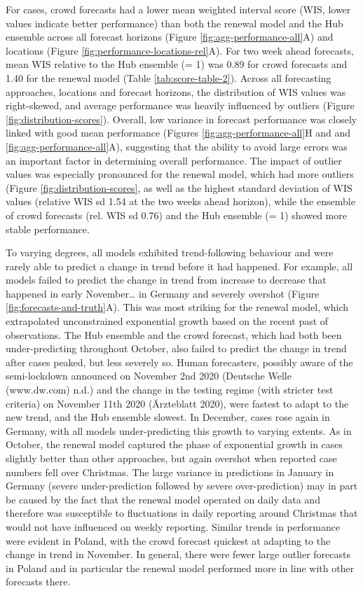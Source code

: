 \documentclass[
]{article}
\begin{document}
For cases, crowd forecasts had a lower mean weighted interval score (WIS, lower values indicate better performance) than both the renewal model and the Hub ensemble across all forecast horizons (Figure \ref{fig:agg-performance-all}A) and locations (Figure \ref{fig:performance-locations-rel}A). For two week ahead forecasts, mean WIS relative to the Hub ensemble (= 1) was 0.89 for crowd forecasts and 1.40 for the renewal model (Table \ref{tab:score-table-2}). Across all forecasting approaches, locations and forecast horizons, the distribution of WIS values was right-skewed, and average performance was heavily influenced by outliers (Figure \ref{fig:distribution-scores}). Overall, low variance in forecast performance was closely linked with good mean performance (Figures \ref{fig:agg-performance-all}H and and \ref{fig:agg-performance-all}A), suggesting that the ability to avoid large errors was an important factor in determining overall performance. The impact of outlier values was especially pronounced for the renewal model, which had more outliers (Figure \ref{fig:distribution-scores}, as well as the highest standard deviation of WIS values (relative WIS sd 1.54 at the two weeks ahead horizon), while the ensemble of crowd forecasts (rel. WIS sd 0.76) and the Hub ensemble (= 1) showed more stable performance.

To varying degrees, all models exhibited trend-following behaviour and were rarely able to predict a change in trend before it had happened. For example, all models failed to predict the change in trend from increase to decrease that happened in early November\ldots{} in Germany and severely overshot (Figure \ref{fig:forecasts-and-truth}A). This was most striking for the renewal model, which extrapolated unconstrained exponential growth based on the recent past of observations. The Hub ensemble and the crowd forecast, which had both been under-predicting throughout October, also failed to predict the change in trend after cases peaked, but less severely so. Human forecasters, possibly aware of the semi-lockdown announced on November 2nd 2020 (Deutsche Welle (www.dw.com) n.d.) and the change in the testing regime (with stricter test criteria) on November 11th 2020 (Ärzteblatt 2020), were fastest to adapt to the new trend, and the Hub ensemble slowest. In December, cases rose again in Germany, with all models under-predicting this growth to varying extents. As in October, the renewal model captured the phase of exponential growth in cases slightly better than other approaches, but again overshot when reported case numbers fell over Christmas. The large variance in predictions in January in Germany (severe under-prediction followed by severe over-prediction) may in part be caused by the fact that the renewal model operated on daily data and therefore was susceptible to fluctuations in daily reporting around Christmas that would not have influenced on weekly reporting. Similar trends in performance were evident in Poland, with the crowd forecast quickest at adapting to the change in trend in November. In general, there were fewer large outlier forecasts in Poland and in particular the renewal model performed more in line with other forecasts there.
\end{document}
